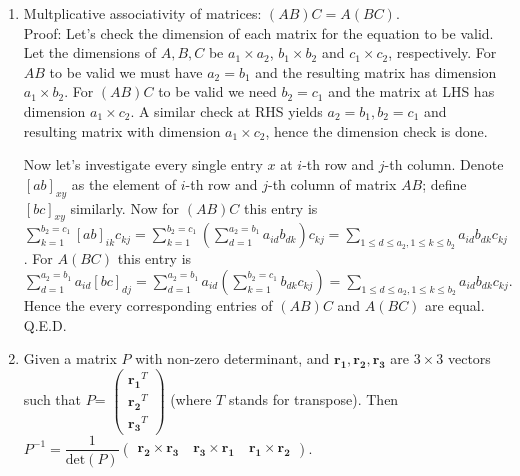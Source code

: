 \documentclass[11pt,a4paper]{article}
\begin{document}
\begin {enumerate}
But notice that the first $n$ elements of $j$-th row ($j>n$) are all zero. It follows that $\displaystyle\sum_{k=1}^{n} \lambda_{kj}a_{ik}$ ($\forall 1\le i\le i$) must be zero. So all other elements must be zero and we have columns onsisting entirely of zeroes after the $n$-th row.

This yields that, the dimension of row space cannot exceed $n$ (some of the rows 1 to $n$ might be entirely zero, in which case we know that dimension of row space $<n$), i.e. cannot exceed the dimension of column space. Similarly the dimension of column space cannot exceed the dimension of row space. Hence they are equal.

\item Multplicative associativity of matrices: $(AB)C=A(BC)$.\\
Proof: Let's check the dimension of each matrix for the equation to be valid. Let the dimensions of $A,B,C$ be $a_1\times a_2$, $b_1\times b_2$ and $c_1\times c_2$, respectively. For $AB$ to be valid we must have $a_2=b_1$ and the resulting matrix has dimension $a_1\times b_2$. For $(AB)C$ to be valid we need $b_2=c_1$ and the matrix at LHS has dimension $a_1\times c_2$. A similar check at RHS yields $a_2=b_1, b_2=c_1$ and resulting matrix with dimension $a_1\times c_2$, hence the dimension check is done.

Now let's investigate every single entry $x$ at $i$-th row and $j$-th column. Denote $[ab]_{xy}$ as the element of $i$-th row and $j$-th column of matrix $AB$; define $[bc]_{xy}$ similarly. Now for $(AB)C$ this entry is $\displaystyle\sum_{k=1}^{b_2=c_1} [ab]_{ik}c_{kj}=\displaystyle\sum_{k=1}^{b_2=c_1} (\displaystyle\sum_{d=1}^{a_2=b_1} a_{id}b_{dk})c_{kj}=\displaystyle\sum_{1\le d\le a_2, 1\le k\le b_2}  a_{id}b_{dk}c_{kj}$. For $A(BC)$ this entry is $\displaystyle\sum_{d=1}^{a_2=b_1} a_{id}[bc]_{dj}=\displaystyle\sum_{d=1}^{a_2=b_1} a_{id}(\displaystyle\sum_{k=1}^{b_2=c_1} b_{dk}c_{kj})=\displaystyle\sum_{1\le d\le a_2, 1\le k\le b_2}  a_{id}b_{dk}c_{kj}.$ Hence the every corresponding entries of $(AB)C$ and $A(BC)$ are equal. Q.E.D.

\item Given a matrix $P$ with non-zero determinant, and $\bm{r_1},\bm{r_2},\bm{r_3}$ are $3\times 3$ vectors such that $P$= $\left( \begin{array}{ccc} \bm{r_1}^T\\ \bm{ r_2}^T\\ \bm{r_3}^T\end{array} \right)$ (where $T$ stands for transpose). Then $P^{-1}=\dfrac{1}{\text{det}(P)}\left( \begin{array}{ccc}  \bm{r_2}\times \bm{r_3}\quad \bm{r_3}\times \bm{r_1} \quad \bm{r_1}\times \bm{r_2}\end{array}\right).$


\end{enumerate}
\end{document}
